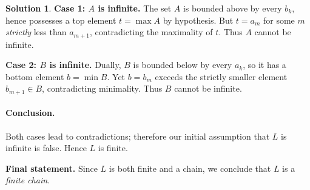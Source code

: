 \documentclass[12pt]{article}
\theoremstyle{definition} %
\newtheorem{solution}{Solution}
\theoremstyle{plain} %
\begin{document}
\begin{solution}
          \smallskip
          \noindent
          \textbf{Case 1: $A$ is infinite.}
          The set $A$ is bounded above by every $b_{k}$, hence possesses a top element
          $t=\max A$ by hypothesis.
          But $t=a_{m}$ for some $m$ \emph{strictly} less than $a_{m+1}$,
          contradicting the maximality of $t$.
          Thus $A$ cannot be infinite.
          
          \smallskip
          \noindent
          \textbf{Case 2: $B$ is infinite.}
          Dually, $B$ is bounded below by every $a_{k}$,
          so it has a bottom element $b=\min B$.
          Yet $b=b_{m}$ exceeds the strictly smaller element $b_{m+1}\in B$,
          contradicting minimality.
          Thus $B$ cannot be infinite.
          
          \medskip
          \paragraph{Conclusion.}
          Both cases lead to contradictions; therefore our initial assumption
          that $L$ is infinite is false.
          Hence $L$ is finite.
          
          \bigskip
          \textbf{Final statement.}
          Since $L$ is both finite and a chain, we conclude that
          $L$ is a \emph{finite chain}.
          \end{solution}
          
\end{document}
